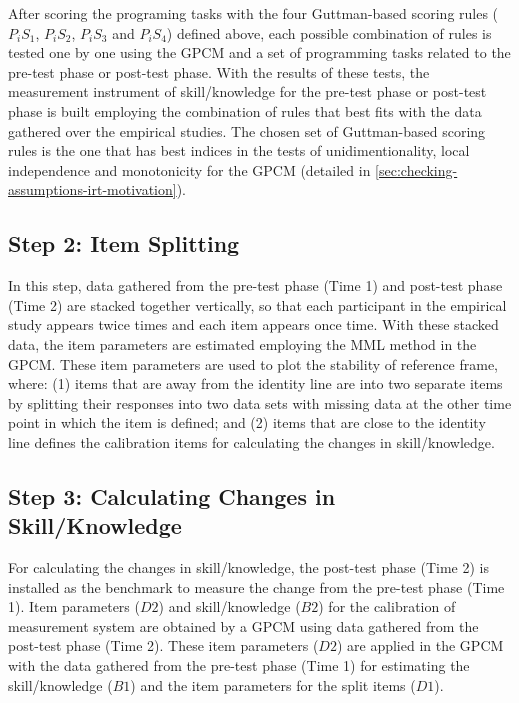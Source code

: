 After scoring the programing tasks with the four Guttman-based scoring rules ($P_{i}S_{1}$, $P_{i}S_{2}$, $P_{i}S_{3}$ and $P_{i}S_{4}$) defined above, each possible combination of rules is tested one by one using the GPCM and a set of programming tasks related to the pre-test phase or post-test phase. With the results of these tests, the measurement instrument of skill/knowledge for the pre-test phase or post-test phase is built employing the combination of rules that best fits with the data gathered over the empirical studies. The chosen set of Guttman-based scoring rules is the one that has best indices in the tests of unidimentionality, local independence and monotonicity for the GPCM (detailed in \autoref{sec:checking-assumptions-irt-motivation}).

\subsection{Step 2: Item Splitting}

In this step, data gathered from the pre-test phase (Time 1) and post-test phase (Time 2) are stacked together vertically, so that each participant in the empirical study appears twice times and each item appears once time. With these stacked data, the item parameters are estimated employing the MML method in the GPCM. These item parameters are used to plot the stability of reference frame, where: (1) items that are away from the identity line are  into two separate items by splitting their responses into two data sets with missing data at the other time point in which the item is defined; and (2) items that are close to the identity line defines the calibration items for calculating the changes in skill/knowledge.

\subsection{Step 3: Calculating Changes in Skill/Knowledge}

For calculating the changes in skill/knowledge, the post-test phase (Time 2) is installed as the benchmark to measure the change from the pre-test phase (Time 1). Item parameters ($D2$) and skill/knowledge ($B2$) for the calibration of measurement system are obtained by a GPCM using data gathered from the post-test phase (Time 2). These item parameters ($D2$) are applied in the GPCM with the data gathered from the pre-test phase (Time 1) for estimating the skill/knowledge ($B1$) and the item parameters for the split items ($D1$).

